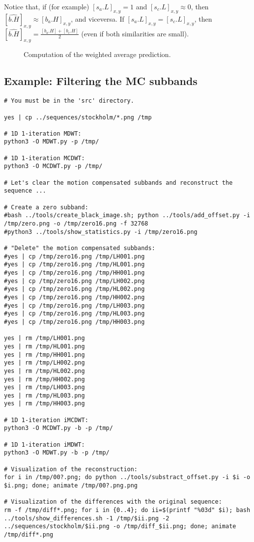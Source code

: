 Notice that, if (for example) $[s_a.L]_{x,y}=1$ and
$[s_c.L]_{x,y}\approx 0$, then
$[\hat{b.H}]_{x,y}\approx [b_a.H]_{x,y}$, and viceversa. If
$[s_a.L]_{x,y}=[s_c.L]_{x,y}$, then
$[\hat{b.H}]_{x,y}=\frac{[b_a.H]+[b_c.H]}{2}$ (even if both similarities are small).

\begin{figure}
  \centering 
  \caption{Computation of the weighted average prediction.}
  \label{fig:weighted_average}
\end{figure}

\subsection*{Example: Filtering the MC subbands}
\begin{verbatim}
# You must be in the 'src' directory.

yes | cp ../sequences/stockholm/*.png /tmp

# 1D 1-iteration MDWT:
python3 -O MDWT.py -p /tmp/

# 1D 1-iteration MCDWT:
python3 -O MCDWT.py -p /tmp/

# Let's clear the motion compensated subbands and reconstruct the sequence ...

# Create a zero subband:
#bash ../tools/create_black_image.sh; python ../tools/add_offset.py -i /tmp/zero.png -o /tmp/zero16.png -f 32768
#python3 ../tools/show_statistics.py -i /tmp/zero16.png

# "Delete" the motion compensated subbands:
#yes | cp /tmp/zero16.png /tmp/LH001.png
#yes | cp /tmp/zero16.png /tmp/HL001.png
#yes | cp /tmp/zero16.png /tmp/HH001.png
#yes | cp /tmp/zero16.png /tmp/LH002.png
#yes | cp /tmp/zero16.png /tmp/HL002.png
#yes | cp /tmp/zero16.png /tmp/HH002.png
#yes | cp /tmp/zero16.png /tmp/LH003.png
#yes | cp /tmp/zero16.png /tmp/HL003.png
#yes | cp /tmp/zero16.png /tmp/HH003.png

yes | rm /tmp/LH001.png
yes | rm /tmp/HL001.png
yes | rm /tmp/HH001.png
yes | rm /tmp/LH002.png
yes | rm /tmp/HL002.png
yes | rm /tmp/HH002.png
yes | rm /tmp/LH003.png
yes | rm /tmp/HL003.png
yes | rm /tmp/HH003.png

# 1D 1-iteration iMCDWT:
python3 -O MCDWT.py -b -p /tmp/

# 1D 1-iteration iMDWT:
python3 -O MDWT.py -b -p /tmp/

# Visualization of the reconstruction:
for i in /tmp/00?.png; do python ../tools/substract_offset.py -i $i -o $i.png; done; animate /tmp/00?.png.png

# Visualization of the differences with the original sequence:
rm -f /tmp/diff*.png; for i in {0..4}; do ii=$(printf "%03d" $i); bash ../tools/show_differences.sh -1 /tmp/$ii.png -2 ../sequences/stockholm/$ii.png -o /tmp/diff_$ii.png; done; animate /tmp/diff*.png
\end{verbatim}

